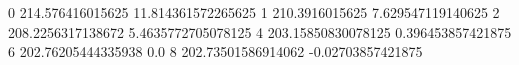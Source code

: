 0 214.576416015625 11.814361572265625
1 210.3916015625 7.629547119140625
2 208.2256317138672 5.4635772705078125
4 203.15850830078125 0.396453857421875
6 202.76205444335938 0.0
8 202.73501586914062 -0.02703857421875
